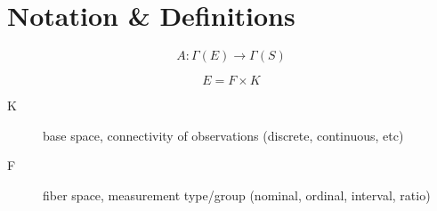 \documentclass[../intro.tex]{subfiles}
\begin{document}
\section{Notation \& Definitions}

\begin{equation}
    A: \Gamma(E) \rightarrow \Gamma(S)
\end{equation}


\begin{equation}
 E = F \times K
\end{equation}

\begin{description}
\item[K] base space, connectivity of observations (discrete, continuous, etc)
\item[F] fiber space, measurement type/group (nominal, ordinal, interval, ratio)
\end{description}

\end{document}
